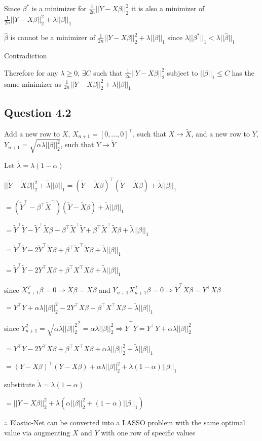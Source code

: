 \documentclass[
]{article}
\begin{document}
Since \(\beta^*\) is a minimizer for \(\frac{1}{2n}||Y-X\beta||^2_2\) it
is also a minimizer of
\(\frac{1}{2n}||Y-X\beta||^2_2+\lambda||\beta||_1\)

\(\hat\beta\) is cannot be a minimizer of
\(\frac{1}{2n}||Y-X\beta||^2_2+\lambda||\beta||_1\) since
\(\lambda||\beta^*||_1 < \lambda||\hat\beta||_1\)

Contradiction

Therefore for any \(\lambda \geq 0\), \(\exists C\) such that
\(\frac{1}{2n}||Y-X\beta||^2_2\) subject to \(||\beta||_1\leq C\) has
the same minimizer as
\(\frac{1}{2n}||Y-X\beta||^2_2+\lambda||\beta||_1\)

\hypertarget{question-4.2}{%
\subsection{Question 4.2}\label{question-4.2}}

Add a new row to \(X\), \(X_{n+1} = [0,...,0]^\top\), such that
\(X \rightarrow \tilde X\), and a new row to \(Y\),
\(Y_{n+1} = \sqrt{\alpha\lambda||\beta||^2_2}\), such that
\(Y \rightarrow \tilde Y\)

Let \(\tilde\lambda = \lambda(1-\alpha)\)

\(||\tilde Y-\tilde X\beta||^2_2 + \tilde\lambda||\beta||_1 = (\tilde Y-\tilde X\beta)^\top(\tilde Y-\tilde X\beta) + \tilde\lambda||\beta||_1\)

\(= (\tilde Y^\top-\beta^\top\tilde X^\top)(\tilde Y-\tilde X\beta) + \tilde\lambda||\beta||_1\)

\(= \tilde Y^\top\tilde Y - \tilde Y^\top\tilde X\beta -\beta^\top\tilde X^\top\tilde Y+\beta^\top\tilde X^\top\tilde X\beta + \tilde\lambda||\beta||_1\)

\(= \tilde Y^\top\tilde Y - 2\tilde Y^\top\tilde X\beta+\beta^\top\tilde X^\top\tilde X\beta + \tilde\lambda||\beta||_1\)

\(= \tilde Y^\top\tilde Y - 2Y^\top X\beta+\beta^\top X^\top X\beta + \tilde\lambda||\beta||_1\)

since \(X_{n+1}^T\beta = 0 \Rightarrow \tilde X\beta = X\beta\) and
\(Y_{n+1}X_{n+1}^T\beta = 0 \Rightarrow \tilde Y^\top\tilde X\beta = Y^\top X\beta\)

\(= Y^\top Y + \alpha\lambda||\beta||^2_2 - 2Y^\top X\beta+\beta^\top X^\top X\beta + \tilde\lambda||\beta||_1\)

since
\(Y_{n+1}^2 = \sqrt{\alpha\lambda||\beta||^2_2}^2 = \alpha\lambda||\beta||^2_2 \Rightarrow \tilde Y^\top\tilde Y=Y^\top Y + \alpha\lambda||\beta||^2_2\)

\(= Y^\top Y - 2Y^\top X\beta+\beta^\top X^\top X\beta + \alpha\lambda||\beta||^2_2 + \tilde\lambda||\beta||_1\)

\(= (Y-X\beta)^\top(Y-X\beta) + \alpha\lambda||\beta||^2_2 + \lambda(1-\alpha)||\beta||_1\)

substitute \(\tilde\lambda = \lambda(1-\alpha)\)

\(= ||Y-X\beta||^2_2 + \lambda(\alpha||\beta||^2_2 + (1-\alpha)||\beta||_1)\)

\(\therefore\) Elastic-Net can be converted into a LASSO problem with
the same optimal value via augmenting \(X\) and \(Y\) with one row of
specific values
\end{document}
